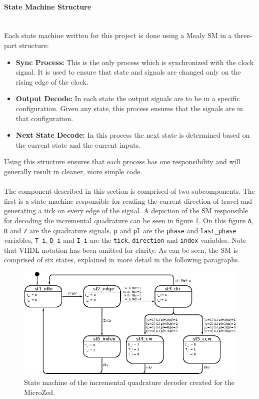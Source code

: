 \paragraph{State Machine Structure}~\\ %
\label{par:state_machine_structure}
Each state machine written for this project is done using a Mealy SM in a three-part structure:
\begin{itemize}
	\item \textbf{Sync Process:} This is the only process which is synchronized with the clock signal.
	It is used to ensure that state and signals are changed only on the rising edge of the clock.
	\item \textbf{Output Decode:} In each state the output signals are to be in a specific configuration.
	Given any state, this process ensures that the signals are in that configuration.
	\item \textbf{Next State Decode:} In this process the next state is determined based on the current state and the current inputs.
\end{itemize}
Using this structure ensures that each process has one responsibility and will generally result in cleaner, more simple code.
\\~\\
The component described in this section is comprised of two subcomponents.
The first is a state machine responsible for reading the current direction of travel and generating a tick on every edge of the signal.
A depiction of the SM responsible for decoding the incremental quadrature can be seen in figure \ref{fig:quadstatemachine}.
On this figure \texttt{A}, \texttt{B} and \texttt{Z} are the quadrature signals, \texttt{p} and \texttt{pl} are the \texttt{phase} and \texttt{last\_phase} variables, \texttt{T\_i}, \texttt{D\_i} and \texttt{I\_i} are the \texttt{tick}, \texttt{direction} and \texttt{index} variables.
Note that VHDL notation has been omitted for clarity.
As can be seen, the SM is comprised of six states, explained in more detail in the following paragraphs.
\begin{figure}[h]
	\centering
	\includegraphics[width=.85\linewidth]{graphics/quad_state_machine}
	\caption{State machine of the incremental quadrature decoder created for the MicroZed.}
	\label{fig:quadstatemachine}
\end{figure}
